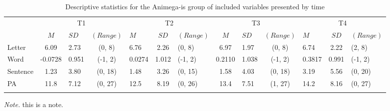 \documentclass[
  english,
  ,man]{apa6}
\begin{document}
\begin{table}[tbp]

\begin{center}
\begin{threeparttable}

\caption{\label{tab:desc-read-animega-table}Descriptive statistics for the Animega-is group of included variables presented by time}

\small{

\begin{tabular}{lclclclclclcl}
\toprule
 & \multicolumn{3}{c}{T1} & \multicolumn{3}{c}{T2} & \multicolumn{3}{c}{T3} & \multicolumn{3}{c}{T4} \\
\cmidrule(r){2-4} \cmidrule(r){5-7} \cmidrule(r){8-10} \cmidrule(r){11-13}
  & $M$ & $SD$ & $(Range)$ & $M$ & $SD$ & $(Range)$ & $M$ & $SD$ & $(Range)$ & $M$ & $SD$ & $(Range)$\\
\midrule
Letter & 6.09 & 2.73 & (0, 8) & 6.76 & 2.26 & (0, 8) & 6.97 & 1.97 & (0, 8) & 6.74 & 2.22 & (2, 8)\\
Word & -0.0728 & 0.951 & (-1, 2) & 0.0274 & 1.012 & (-1, 2) & 0.2110 & 1.038 & (-1, 2) & 0.3817 & 0.991 & (-1, 2)\\
Sentence & 1.23 & 3.80 & (0, 18) & 1.48 & 3.26 & (0, 15) & 1.58 & 4.03 & (0, 18) & 3.19 & 5.56 & (0, 20)\\
PA & 11.8 & 7.12 & (0, 27) & 12.5 & 8.19 & (0, 26) & 13.4 & 7.51 & (1, 27) & 14.2 & 8.16 & (0, 27)\\
\bottomrule
\addlinespace
\end{tabular}

}

\begin{tablenotes}[para]
\normalsize{\textit{Note.} this is a note.}
\end{tablenotes}

\end{threeparttable}
\end{center}

\end{table}
\end{document}

